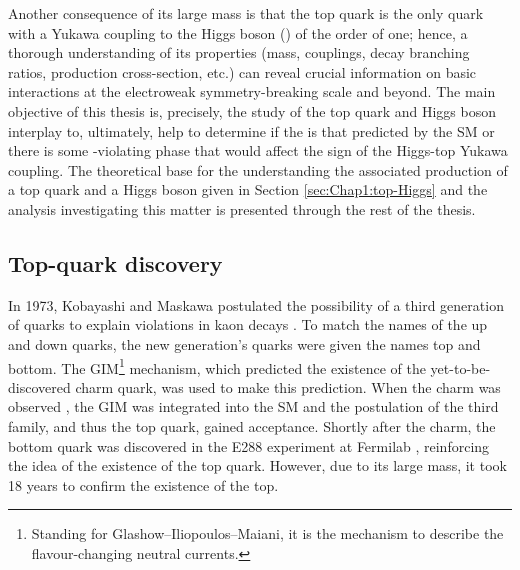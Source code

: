 Another consequence of its large mass is that  the top quark is the only quark with a Yukawa 
coupling to the Higgs boson (\yt) of the order of one; hence, a thorough understanding of its 
properties (mass, couplings, decay branching ratios, production cross-section, etc.) can reveal
crucial information on basic interactions at the electroweak symmetry-breaking 
scale and beyond. The main objective of this thesis is, precisely, the study of the top quark and Higgs
boson interplay to, ultimately, help to determine if the \yt is that predicted by the SM or there is some \CP-violating
phase that would affect the sign of the Higgs-top Yukawa coupling. The theoretical base for the understanding
the associated production of a top quark and a Higgs boson given in Section \ref{sec:Chap1:top-Higgs} and 
the analysis investigating this matter is presented through the rest of the thesis.%




\subsection{Top-quark discovery}
In 1973, Kobayashi and Maskawa postulated the possibility of a third generation of quarks to explain \CP
violations in kaon decays \cite{Kobayashi:1973fv}. To match the names of the up and down quarks, the new
generation's quarks were given the names top and bottom.
The GIM\footnote{Standing for Glashow–Iliopoulos–Maiani, it is the mechanism to describe the flavour-changing neutral currents. }
 mechanism\cite{Glashow:1970gm}, which predicted the existence of the yet-to-be-discovered charm quark, was used to 
make this prediction.
When the charm was observed \cite{SLAC-SP-017:1974ind}, the GIM was integrated into the SM
and the postulation of the third family, and thus the top quark, gained acceptance. 
Shortly after the charm, the bottom quark was discovered in the E288 experiment 
at Fermilab \cite{Herb:1977ek}, reinforcing the idea of the existence of the top quark.
However, due to its large mass, it took 18 years to confirm the existence of the top.


